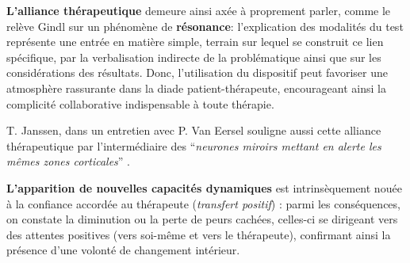 \begin{itemize}
 
 \textbf{L'alliance thérapeutique} demeure ainsi axée à proprement parler, comme le relève Gindl
 \autocite{gindl} sur
 un phénomène de \textbf{résonance}:  l'explication des modalités du test représente une
 entrée en matière simple, terrain  sur lequel se construit ce lien spécifique,
 par la verbalisation indirecte de la problématique ainsi que sur
 les considérations des résultats.
 Donc, l'utilisation
 du dispositif peut favoriser une atmosphère rassurante dans la diade
 patient-thérapeute, encourageant ainsi la complicité collaborative
 indispensable à toute
 thérapie.
 
 
 


 
 
 T. Janssen, dans un entretien
 avec P. Van Eersel
 souligne aussi cette alliance thérapeutique
 par l'intermédiaire des ``\textit{neurones
 	miroirs mettant en alerte les mêmes zones corticales}'' \autocite[203]{van_eersel_cerveau}.
 
 \textbf{L'apparition de nouvelles
 	capacités  dynamiques }est intrinsèquement nouée à la confiance
 accordée au thérapeute (\textit{transfert positif})
 \autocite{roustang1986} : parmi les conséquences, on constate la
 diminution ou la perte de peurs cachées, celles-ci se dirigeant vers des
 attentes positives (vers soi-même et vers le thérapeute), confirmant ainsi la
 présence d'une volonté de changement intérieur.
 

\end{itemize}
